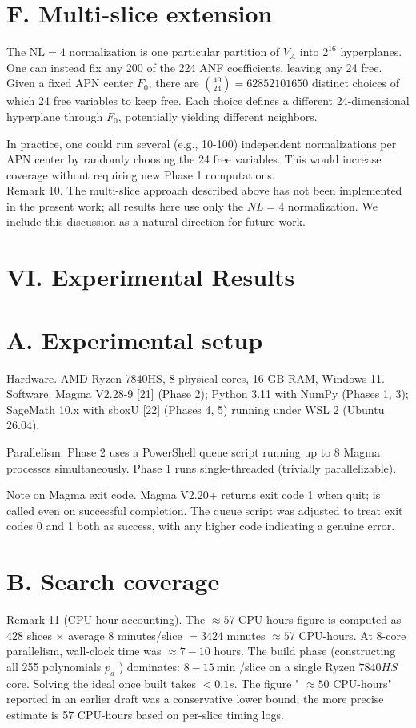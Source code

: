 \documentclass[10pt]{article}
\begin{document}
\section*{F. Multi-slice extension}
The $\mathrm{NL}=4$ normalization is one particular partition of $V_{A}$ into $2^{16}$ hyperplanes. One can instead fix any 200 of the 224 ANF coefficients, leaving any 24 free. Given a fixed APN center $F_{0}$, there are $\binom{40}{24}=62852101650$ distinct choices of which 24 free variables to keep free. Each choice defines a different 24-dimensional hyperplane through $F_{0}$, potentially yielding different neighbors.

In practice, one could run several (e.g., 10-100) independent normalizations per APN center by randomly choosing the 24 free variables. This would increase coverage without requiring new Phase 1 computations.\\
Remark 10. The multi-slice approach described above has not been implemented in the present work; all results here use only the $N L=4$ normalization. We include this discussion as a natural direction for future work.

\section*{VI. Experimental Results}
\section*{A. Experimental setup}
Hardware. AMD Ryzen 7840HS, 8 physical cores, 16 GB RAM, Windows 11.\\[0pt]
Software. Magma V2.28-9 [21] (Phase 2); Python 3.11 with NumPy (Phases 1, 3); SageMath 10.x with sboxU [22] (Phases 4, 5) running under WSL 2 (Ubuntu 26.04).

Parallelism. Phase 2 uses a PowerShell queue script running up to 8 Magma processes simultaneously. Phase 1 runs single-threaded (trivially parallelizable).

Note on Magma exit code. Magma V2.20+ returns exit code 1 when quit; is called even on successful completion. The queue script was adjusted to treat exit codes 0 and 1 both as success, with any higher code indicating a genuine error.

\section*{B. Search coverage}
Remark 11 (CPU-hour accounting). The $\approx 57$ CPU-hours figure is computed as 428 slices × average 8 minutes/slice $=3424$ minutes $\approx 57$ CPU-hours. At 8-core parallelism, wall-clock time was $\approx 7-10$ hours. The build phase (constructing all 255 polynomials $p_{a}$ ) dominates: $8-15 \mathrm{~min}$ /slice on a single Ryzen $7840 H S$ core. Solving the ideal once built takes $<0.1 s$. The figure " $\approx 50$ CPU-hours" reported in an earlier draft was a conservative lower bound; the more precise estimate is 57 CPU-hours based on per-slice timing logs.
\end{document}
